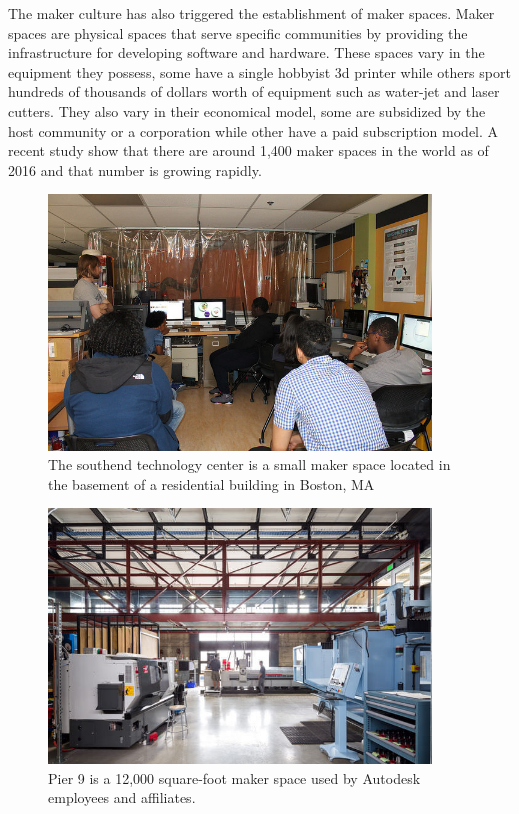 The maker culture has also triggered the establishment of maker spaces. Maker spaces are physical spaces that serve specific communities by providing the infrastructure for developing software and hardware. These spaces vary in the equipment they possess, some have a single hobbyist 3d printer while others sport hundreds of thousands of dollars worth of equipment such as water-jet and laser cutters. They also vary in their economical model, some are subsidized by the host community or a corporation while other have a paid subscription model. A recent study show that there are around 1,400 maker spaces in the world as of 2016 and that number is growing rapidly\cite{makersbynumbers}.

   \begin{figure}[thpb]
      \centering
      \includegraphics[width=4in]{figures/setc-fablab.jpg}
      \caption{The southend technology center is a small maker space located in the basement of a residential building in Boston, MA \cite{setc}}
      \label{fig_setc_class}
   \end{figure}

   \begin{figure}[thpb]
      \centering
      \includegraphics[width=4in]{figures/pier9.jpg}
      \caption{Pier 9 is a 12,000 square-foot maker space used by Autodesk employees and affiliates.\cite{pier9}}
      \label{fig_pier9}
   \end{figure}

